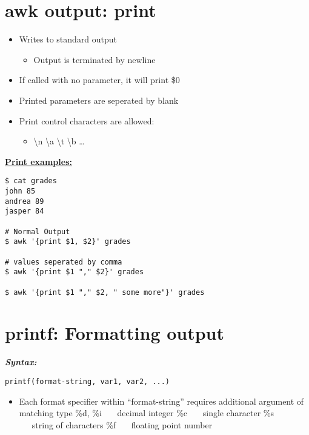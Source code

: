 \documentclass{report}
\begin{document}
\section{awk output: print}
\begin{itemize}
  \item Writes to standard output 
    \begin{itemize}
      \item Output is terminated by newline 
    \end{itemize}
  \item If called with no parameter, it will print \$0
  \item Printed parameters are seperated by blank   
  \item Print control characters are allowed:
    \begin{itemize}
      \item \textbackslash n \textbackslash a \textbackslash t \textbackslash b \ldots
    \end{itemize}
\end{itemize}
\bigbreak \noindent
\textbf{\underline{Print examples:}}
\begin{mdframed}
\begin{verbatim}
$ cat grades
john 85
andrea 89
jasper 84

# Normal Output
$ awk '{print $1, $2}' grades

# values seperated by comma
$ awk '{print $1 "," $2}' grades

$ awk '{print $1 "," $2, " some more"}' grades
\end{verbatim}
\end{mdframed}
\newpage
\section{printf: Formatting output}
\bigbreak \noindent
\textbf{\textit{Syntax:}}
\begin{verbatim}
printf(format-string, var1, var2, ...)
\end{verbatim}
\begin{itemize}
  \item Each format specifier within ``format-string'' requires additional argument of matching type 
    \subitem \%d, \%i \ \ \ decimal integer
    \subitem \%c \ \ \ single character
    \subitem \%s \ \ \ string of characters
    \subitem \%f \ \ \ floating point number
\end{itemize}
\end{document}
